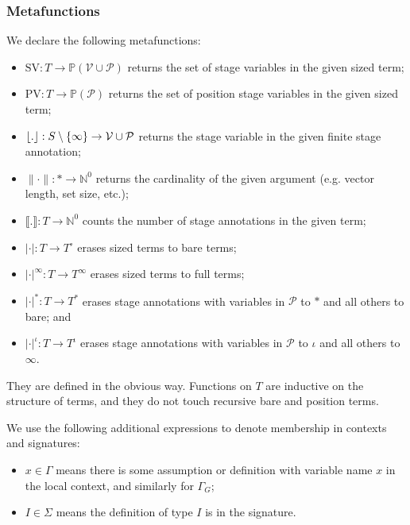 \documentclass[sigplan,10pt,anonymous,review]{acmart}
\begin{document}
\subsubsection{Metafunctions}

We declare the following metafunctions:

\begin{itemize}
    \item $\text{SV}: T \to \mathbb{P}(\mathcal{V} \cup \mathcal{P})$ returns the set of stage variables in the given sized term;
    \item $\text{PV}: T \to \mathbb{P}(\mathcal{P})$ returns the set of position stage variables in the given sized term;
    \item $\lfloor . \rfloor: S \setminus \{\infty\} \to \mathcal{V} \cup \mathcal{P}$ returns the stage variable in the given finite stage annotation;
    \item $\|\cdot\|: * \to \mathbb{N}^0$ returns the cardinality of the given argument (e.g. vector length, set size, etc.);
    \item $\llbracket.\rrbracket: T \to \mathbb{N}^0$ counts the number of stage annotations in the given term;
    \item $|\cdot|: T \to T^\circ$ erases sized terms to bare terms;
    \item $|\cdot|^\infty: T \to T^\infty$ erases sized terms to full terms;
    \item $|\cdot|^*: T \to T^*$ erases stage annotations with variables in $\mathcal{P}$ to $*$ and all others to bare; and
    \item $|\cdot|^\iota: T \to T^\iota$ erases stage annotations with variables in $\mathcal{P}$ to $\iota$ and all others to $\infty$.
\end{itemize}

They are defined in the obvious way. Functions on $T$ are inductive on the structure of terms, and they do not touch recursive bare and position terms.

We use the following additional expressions to denote membership in contexts and signatures:

\begin{itemize}
    \item $x \in \Gamma$ means there is some assumption or definition with variable name $x$ in the local context, and similarly for $\Gamma_G$;
    \item $I \in \Sigma$ means the \coinductive definition of type $I$ is in the signature.
\end{itemize}
\end{document}

